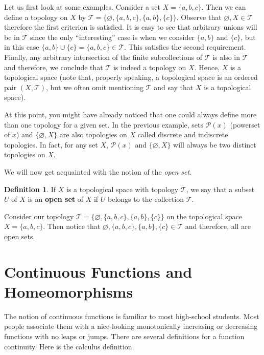 \documentclass{article}
\newcommand{\pset}{\mathcal{P}}                  %
\newcommand{\topology}{\mathcal{T}}              %
\renewcommand{\emptyset}{\varnothing}            %
\theoremstyle{definition}
\newtheorem*{definition}{Definition}
\begin{document}
Let us first look at some examples. Consider a set $X = \{a, b, c\}$.
Then we can define a topology on $X$ by $\topology = \{\emptyset, \{a, b, c\}, \{a, b\}, \{c\}\}$.
Observe that $\emptyset, X \in \topology$ therefore the first criterion is satisfied.
It is easy to see that arbitrary unions will be in $\topology$ since the only ``interesting''
case is when we consider $\{a, b\}$ and $\{c\}$, but in this case $\{a, b\} \cup \{c\} = \{a, b, c\} \in \topology$.
This satisfies the second requirement. Finally, any arbitrary intersection of the finite subcollections of $\topology$
is also in $\topology$ and therefore, we conclude that $\topology$ is indeed a topology on $X$.
Hence, $X$ is a topological space (note that, properly speaking, a topological space is an ordered pair $(X, \topology)$,
but we often omit mentioning $\topology$ and say that $X$ is a topological space).

\bigskip

At this point, you might have already noticed that one could always define more than one topology
for a given set. In the previous example, sets $\pset{(x)}$ (powerset of $x$) and $\{\emptyset, X\}$
are also topologies on $X$ called discrete and indiscrete topologies. In fact, for any set $X$,
$\pset{(x)}$ and $\{\emptyset, X\}$ will always be two distinct topologies on $X$.

\bigskip

We will now get acquainted with the notion of the \textit{open set}.

\begin{definition}
\cite{4}  If $X$ is a topological space with topology $\topology$, we say that a subset $U$ of $X$ is an
\textbf{open set} of $X$ if $U$ belongs to the collection $\topology$.
\end{definition}

Consider our topology $\topology = \{\emptyset, \{a, b, c\}, \{a, b\}, \{c\}\}$ on the topological space $X = \{a, b, c\}$.
Then notice that $\emptyset, \{a, b, c\}, \{a, b\}, \{c\} \in \topology$ and therefore, all are open sets.


\section*{\centering Continuous Functions and Homeomorphisms}
The notion of continuous functions is familiar to most high-school students.
Most people associate them with a nice-looking monotonically increasing or decreasing
functions with no leaps or jumps. There are several definitions for a function continuity.
Here is the calculus definition.
\end{document}
